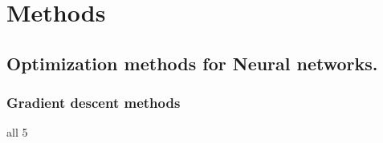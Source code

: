 \chapter{Methods}\label{method}
\section{Optimization methods for Neural networks.}
\subsection{Gradient descent methods }
all 5 
